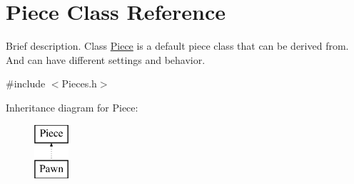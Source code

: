 \hypertarget{class_piece}{\section{Piece Class Reference}
\label{class_piece}
}


Brief description. Class \hyperlink{class_piece}{Piece} is a default piece class that can be derived from. And can have different settings and behavior.  




{\ttfamily \#include $<$Pieces.\-h$>$}

Inheritance diagram for Piece\-:\begin{figure}[H]
\begin{center}
\leavevmode
\includegraphics[height=2.000000cm]{class_piece}
\end{center}
\end{figure}
